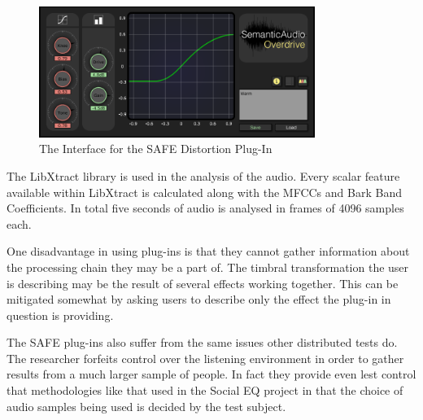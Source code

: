 		\begin{figure}[h!]
			\centering
			\includegraphics[width=0.8\textwidth]{chapter4/Images/SAFEDistortion.png}
			\caption{The Interface for the SAFE Distortion Plug-In}
			\label{fig:SAFE-Distortion}
		\end{figure}

		The LibXtract library \citep{bullock2007libxtract} is used in the analysis of the audio. Every scalar
		feature available within LibXtract is calculated along with the MFCCs and Bark Band Coefficients. In total
		five seconds of audio is analysed in frames of 4096 samples each.


		One disadvantage in using plug-ins is that they cannot gather information about the processing chain they
		may be a part of. The timbral transformation the user is describing may be the result of several effects
		working together. This can be mitigated somewhat by asking users to describe only the effect the plug-in in
		question is providing.

		The SAFE plug-ins also suffer from the same issues other distributed tests do. The researcher forfeits
		control over the listening environment in order to gather results from a much larger sample of people. In
		fact they provide even lest control that methodologies like that used in the Social EQ project
		\citep{cartwright2013socialeq} in that the choice of audio samples being used is decided by the test
		subject. 

